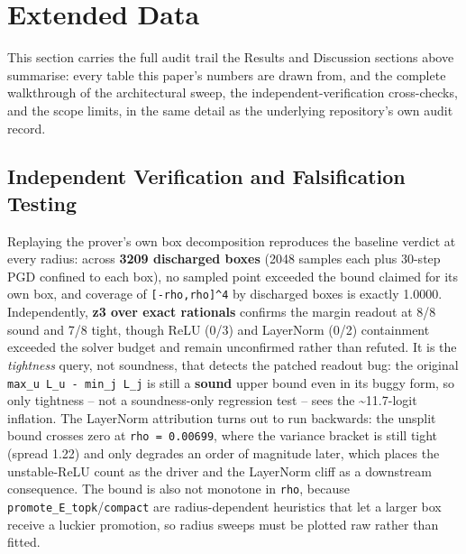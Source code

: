 \documentclass[sn-nature,pdflatex]{sn-jnl}
\begin{document}
\clearpage
\section{Extended Data}

This section carries the full audit trail the Results and Discussion sections above summarise: every table this paper's numbers are drawn from, and the complete walkthrough of the architectural sweep, the independent-verification cross-checks, and the scope limits, in the same detail as the underlying repository's own audit record.

\subsection{Independent Verification and Falsification Testing}
Replaying the prover's own box decomposition reproduces the baseline verdict at every radius: across \textbf{3209 discharged boxes} (2048 samples each plus 30-step PGD confined to each box), no sampled point exceeded the bound claimed for its own box, and coverage of \texttt{[-rho,rho]\textasciicircum{}4} by discharged boxes is exactly 1.0000. 
Independently, \textbf{z3 over exact rationals} confirms the margin readout at 8/8 sound and 7/8 tight, though ReLU (0/3) and LayerNorm (0/2) containment exceeded the solver budget and remain unconfirmed rather than refuted. It is the \emph{tightness} query, not soundness, that detects the patched readout bug: the original \texttt{max\_u L\_u - min\_j L\_j} is still a \textbf{sound} upper bound even in its buggy form, so only tightness -- not a soundness-only regression test -- sees the \textasciitilde{}11.7-logit inflation. 
The LayerNorm attribution turns out to run backwards: the unsplit bound crosses zero at \texttt{rho = 0.00699}, where the variance bracket is still tight (spread 1.22) and only degrades an order of magnitude later, which places the unstable-ReLU count as the driver and the LayerNorm cliff as a downstream consequence. The bound is also not monotone in \texttt{rho}, because \texttt{promote\_E\_topk}/\texttt{compact} are radius-dependent heuristics that let a larger box receive a luckier promotion, so radius sweeps must be plotted raw rather than fitted.
\end{document}
